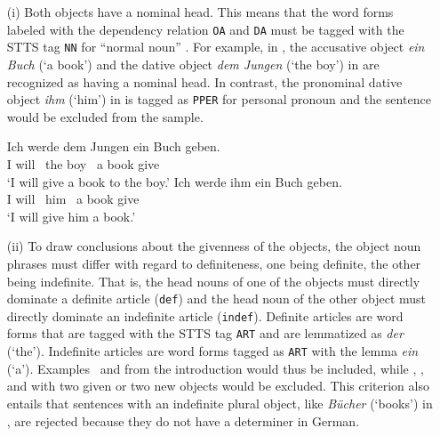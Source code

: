 \documentclass[output=paper,colorlinks,citecolor=brown]{langscibook}
\begin{document}
\begin{enumerate}
  \item[(i)] Both objects have a nominal head. This means that the word forms labeled with the dependency relation \texttt{OA} and \texttt{DA} must be tagged with the STTS tag \texttt{NN} for ``normal noun'' \citep{schiller-et-al99}. For example, in , the accusative object \textit{ein Buch} (`a book') and the dative object \textit{dem Jungen} (`the boy') in  are recognized as having a nominal head. In contrast, the pronominal dative object \textit{ihm} (`him') in  is tagged as \texttt{PPER} for personal pronoun and the sentence would be excluded from the sample.
  
\ea\label{ex:nominal_head_both}
  \ea\label{ex:nominal_head}
  \gll Ich werde \up{[}dem Jungen\up{/\texttt{NN}/\texttt{DA}]\sub{\textsc{dat}}} \up{[}ein Buch\up{/\texttt{NN}/\texttt{OA}]\sub{\textsc{acc}}} geben. \\
   I will {\ the} boy {\ a} book give \\
   \glt `I will give a book to the boy.'
%    
  \ex\label{ex:non-nominal_head} 
  \gll Ich werde \up{[}ihm\up{/\texttt{PPER}/\texttt{DA}]\sub{\textsc{dat}}} \up{[}ein Buch\up{/\texttt{NN}/\texttt{OA}]\sub{\textsc{acc}}} geben. \\
    I will {\ him} {\ a} book give \\
  \glt `I will give him a book.'
  \z
\z
  
  \item[(ii)] To draw conclusions about the givenness of the objects, the object noun phrases must differ with regard to definiteness, one being definite, the other being indefinite. That is, the head nouns of one of the objects must directly dominate a definite article (\texttt{def}) and the head noun of the other object must directly dominate an indefinite article (\texttt{indef}). Definite articles are word forms that are tagged with the STTS tag \texttt{ART} and are lemmatized as \textit{der} (`the'). Indefinite articles are word forms tagged as \texttt{ART} with the lemma \textit{ein} (`a'). 
  Examples~ and  from the introduction would thus be included, while , , and  with two given or two new objects would be excluded. This criterion also entails that sentences with an indefinite plural object, like \textit{Bücher} (`books') in , are rejected because they do not have a determiner in German.
  

\end{enumerate}
\end{document}
